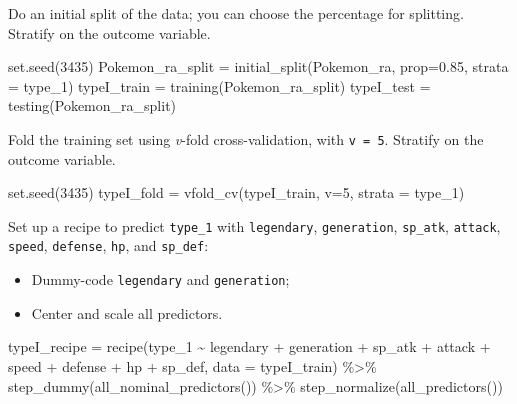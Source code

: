 \documentclass[
]{article}
\newenvironment{Shaded}{\begin{snugshade}}{\end{snugshade}}
\newcommand{\AttributeTok}[1]{\textcolor[rgb]{0.77,0.63,0.00}{#1}}
\newcommand{\DecValTok}[1]{\textcolor[rgb]{0.00,0.00,0.81}{#1}}
\newcommand{\FloatTok}[1]{\textcolor[rgb]{0.00,0.00,0.81}{#1}}
\newcommand{\FunctionTok}[1]{\textcolor[rgb]{0.00,0.00,0.00}{#1}}
\newcommand{\NormalTok}[1]{#1}
\newcommand{\OtherTok}[1]{\textcolor[rgb]{0.56,0.35,0.01}{#1}}
\newcommand{\SpecialCharTok}[1]{\textcolor[rgb]{0.00,0.00,0.00}{#1}}
\providecommand{\tightlist}{%
  \setlength{\itemsep}{0pt}\setlength{\parskip}{0pt}}
\begin{document}
Do an initial split of the data; you can choose the percentage for
splitting. Stratify on the outcome variable.

\begin{Shaded}
\begin{Highlighting}[]
\FunctionTok{set.seed}\NormalTok{(}\DecValTok{3435}\NormalTok{)}
\NormalTok{Pokemon\_ra\_split }\OtherTok{=} \FunctionTok{initial\_split}\NormalTok{(Pokemon\_ra, }\AttributeTok{prop=}\FloatTok{0.85}\NormalTok{, }\AttributeTok{strata =}\NormalTok{ type\_1)}
\NormalTok{typeI\_train }\OtherTok{=} \FunctionTok{training}\NormalTok{(Pokemon\_ra\_split)}
\NormalTok{typeI\_test }\OtherTok{=} \FunctionTok{testing}\NormalTok{(Pokemon\_ra\_split)}
\end{Highlighting}
\end{Shaded}

Fold the training set using \emph{v}-fold cross-validation, with
\texttt{v\ =\ 5}. Stratify on the outcome variable.

\begin{Shaded}
\begin{Highlighting}[]
\FunctionTok{set.seed}\NormalTok{(}\DecValTok{3435}\NormalTok{)}
\NormalTok{typeI\_fold }\OtherTok{=} \FunctionTok{vfold\_cv}\NormalTok{(typeI\_train, }\AttributeTok{v=}\DecValTok{5}\NormalTok{, }\AttributeTok{strata =}\NormalTok{ type\_1)}
\end{Highlighting}
\end{Shaded}

Set up a recipe to predict \texttt{type\_1} with \texttt{legendary},
\texttt{generation}, \texttt{sp\_atk}, \texttt{attack}, \texttt{speed},
\texttt{defense}, \texttt{hp}, and \texttt{sp\_def}:

\begin{itemize}
\tightlist
\item
  Dummy-code \texttt{legendary} and \texttt{generation};
\item
  Center and scale all predictors.
\end{itemize}

\begin{Shaded}
\begin{Highlighting}[]
\NormalTok{typeI\_recipe }\OtherTok{=} \FunctionTok{recipe}\NormalTok{(type\_1 }\SpecialCharTok{\textasciitilde{}}\NormalTok{ legendary }\SpecialCharTok{+}\NormalTok{ generation }\SpecialCharTok{+}\NormalTok{ sp\_atk }\SpecialCharTok{+} 
\NormalTok{                      attack }\SpecialCharTok{+}\NormalTok{  speed }\SpecialCharTok{+}\NormalTok{ defense }\SpecialCharTok{+}\NormalTok{ hp }\SpecialCharTok{+}\NormalTok{ sp\_def,}
                      \AttributeTok{data =}\NormalTok{ typeI\_train) }\SpecialCharTok{\%\textgreater{}\%}
  \FunctionTok{step\_dummy}\NormalTok{(}\FunctionTok{all\_nominal\_predictors}\NormalTok{()) }\SpecialCharTok{\%\textgreater{}\%} 
  \FunctionTok{step\_normalize}\NormalTok{(}\FunctionTok{all\_predictors}\NormalTok{())}
\end{Highlighting}
\end{Shaded}
\end{document}
